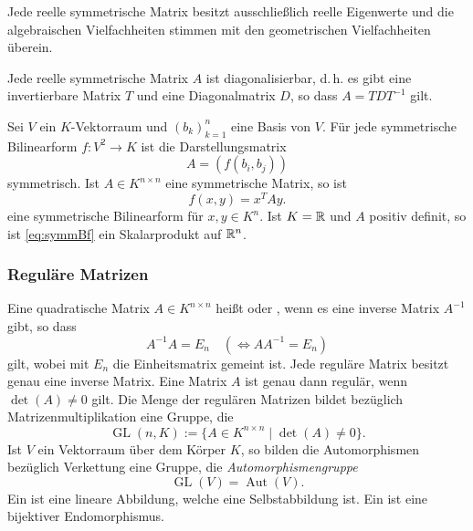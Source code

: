 Jede reelle symmetrische Matrix besitzt ausschließlich reelle
Eigenwerte und die algebraischen Vielfachheiten stimmen mit den
geometrischen Vielfachheiten überein.

Jede reelle symmetrische Matrix $A$ ist diagonalisierbar, d.\,h. es gibt
eine invertierbare Matrix $T$ und eine Diagonalmatrix $D$, so dass
$A=TDT^{-1}$ gilt.

Sei $V$ ein $K$-Vektorraum und $(b_k)_{k=1}^n$ eine Basis von $V$.
Für jede symmetrische Bilinearform
$f\colon V^2\to K$ ist die
Darstellungsmatrix
\begin{equation}
A = (f(b_i,b_j))
\end{equation}
symmetrisch. Ist $A\in K^{n\times n}$ eine symmetrische Matrix, so
ist
\begin{equation}\label{eq:symmBf}
f(x,y) = x^T A y.
\end{equation}
eine symmetrische Bilinearform für  $x,y\in K^n$.
Ist $K=\mathbb R$ und $A$ positiv definit, so ist
\eqref{eq:symmBf} ein Skalarprodukt auf $\mathbb R^n$.

\subsubsection{Reguläre Matrizen}
Eine quadratische Matrix $A\in K^{n\times n}$ heißt 
oder , wenn es eine inverse Matrix $A^{-1}$ gibt,
so dass
\begin{equation}
A^{-1}A = E_n \quad (\iff AA^{-1} = E_n)
\end{equation}
gilt, wobei mit $E_n$ die Einheitsmatrix gemeint ist. Jede
reguläre Matrix besitzt genau eine inverse Matrix. Eine Matrix $A$
ist genau dann regulär, wenn $\det(A)\ne 0$ gilt. Die Menge
der regulären Matrizen bildet bezüglich Matrizenmultiplikation
eine Gruppe, die
\begin{equation}
\operatorname{GL}(n,K) := \{A\in K^{n\times n}\mid\det(A)\ne 0\}.
\end{equation}
Ist $V$ ein Vektorraum über dem Körper $K$, so bilden die
Automorphismen bezüglich Verkettung eine Gruppe, die
\emph{Automorphismengruppe}
\begin{equation}
\operatorname{GL}(V) = \operatorname{Aut}(V).
\end{equation}
Ein 
ist eine lineare Abbildung, welche eine Selbstabbildung ist.
Ein 
ist eine bijektiver Endomorphismus.

